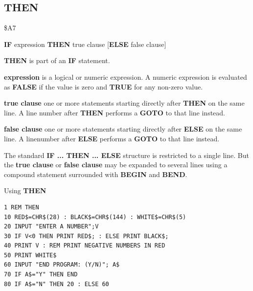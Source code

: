 
\newpage
\subsection{THEN}
\begin{description}[leftmargin=2cm,style=nextline]
\item [Token:] \$A7
\item [Format:] {\bf IF} expression {\bf THEN} true clause
		[{\bf ELSE} false clause]
\item [Usage:] {\bf THEN} is part of an {\bf IF} statement.

                {\bf expression} is a logical or numeric expression.
                A numeric expression is evaluated as {\bf FALSE}
                if the value is zero and {\bf TRUE} for any non-zero
                value.

                {\bf true clause} one or more statements starting
                directly after {\bf THEN} on the same line.
                A line number after {\bf THEN} performs a
                {\bf GOTO} to that line instead.

                {\bf false clause} one or more statements starting
                directly after {\bf ELSE} on the same line.
                A linenumber after {\bf ELSE} performs a
                {\bf GOTO} to that line instead.

\item [Remarks:]
               The standard {\bf IF ... THEN ... ELSE} structure
               is restricted to a single line. But the {\bf true clause}
               or {\bf false clause} may be expanded to several lines
               using a compound statement surrounded with
               {\bf BEGIN} and {\bf BEND}.
\item [Example:]
                Using {\bf THEN}
\begin{tcolorbox}[colback=black,coltext=white]
\verbatimfont{\codefont}
\begin{verbatim}
1 REM THEN
10 RED$=CHR$(28) : BLACK$=CHR$(144) : WHITE$=CHR$(5)
20 INPUT "ENTER A NUMBER";V
30 IF V<0 THEN PRINT RED$; : ELSE PRINT BLACK$;
40 PRINT V : REM PRINT NEGATIVE NUMBERS IN RED
50 PRINT WHITE$
60 INPUT "END PROGRAM: (Y/N)"; A$
70 IF A$="Y" THEN END
80 IF A$="N" THEN 20 : ELSE 60
\end{verbatim}
\end{tcolorbox}
\end{description}

